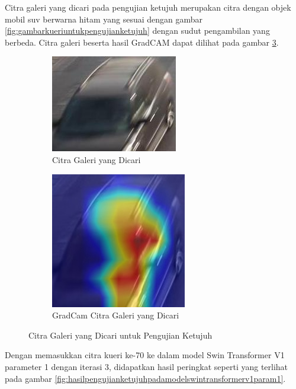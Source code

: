 Citra galeri yang dicari pada pengujian ketujuh merupakan citra dengan objek mobil suv berwarna hitam 
yang sesuai dengan gambar \ref{fig:gambarkueriuntukpengujianketujuh} dengan sudut pengambilan yang berbeda. 
Citra galeri beserta hasil GradCAM dapat dilihat pada gambar \ref{fig:gambargaleriuntukpengujianketujuh}.

\begin{figure}[h!]
  \centering
  \begin{subfigure}{.5\textwidth}
    \centering
    \includegraphics[width=.5\linewidth]{gambar/Gal70_114.jpg}
    \caption{Citra Galeri yang Dicari}
    \label{gambargalerinomortujuhpuluh}
  \end{subfigure}%
  \begin{subfigure}{.5\textwidth}
    \centering
    \includegraphics[width=.5\linewidth]{gambar/GradCamGal70_114.jpg}
    \caption{GradCam Citra Galeri yang Dicari}
    \label{gradcamgambargalerinomortujuhpuluh}
  \end{subfigure}
  \caption{Citra Galeri yang Dicari untuk Pengujian Ketujuh}
  \label{fig:gambargaleriuntukpengujianketujuh}
\end{figure}

Dengan memasukkan citra kueri ke-70 ke dalam model Swin Transformer V1 parameter 1 dengan iterasi 3, didapatkan hasil 
peringkat seperti yang terlihat pada gambar \ref{fig:hasilpengujianketujuhpadamodelswintransformerv1param1}.

